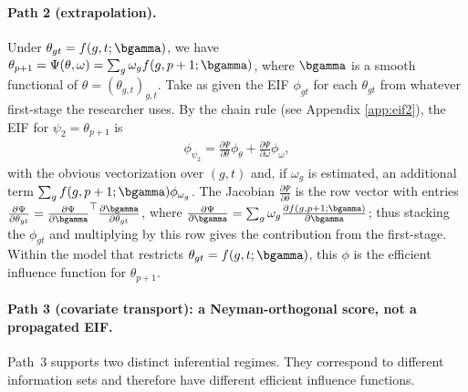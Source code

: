 \documentclass{article}
\begin{document}
\paragraph{Path 2 (extrapolation).} Under $\theta_{gt} = f(g,t;\bgamma)$, we have $\theta_{p+1} = \Psi(\theta, \omega) = \sum_g \omega_g f(g, p+1; \bgamma)$, where $\bgamma$ is a smooth functional of $\theta = (\theta_{g,t})_{g,t}$. Take as given the EIF $\phi_{gt}$ for each $\theta_{gt}$ from whatever first-stage the researcher uses. By the chain rule (see Appendix \ref{app:eif2}), the EIF for $\psi_2 = \theta_{p+1}$ is
\begin{align*}
    \phi_{\psi_2} = \frac{\partial \Psi}{\partial \theta} \phi_{\theta} + \frac{\partial \Psi}{\partial \omega} \phi_{\omega},
\end{align*}
with the obvious vectorization over $(g,t)$ and, if $\omega_g$ is estimated, an additional term $\sum_g f(g,p+1;\bgamma) \phi_{\omega_g}$. The Jacobian $\frac{\partial \Psi}{\partial \theta}$ is the row vector with entries $\frac{\partial \Psi}{\partial \theta_{gt}} = \frac{\partial \Psi}{\partial \bgamma}^\top \frac{\partial \bgamma}{\partial \theta_{gt}}$, where $\frac{\partial \Psi}{\partial \bgamma} = \sum_g \omega_g \frac{\partial f(g,p+1;\bgamma)}{\partial \bgamma}$; thus stacking the $\phi_{gt}$ and multiplying by this row gives the contribution from the first-stage. Within the model that restricts $\theta_{gt} = f(g,t;\bgamma)$, this $\phi$ is the efficient influence function for $\theta_{p+1}$.

\paragraph{Path 3 (covariate transport): a Neyman-orthogonal score, not a propagated EIF.} Path~3 supports two distinct inferential regimes. They correspond to different information sets and therefore have different efficient influence functions.
\end{document}
